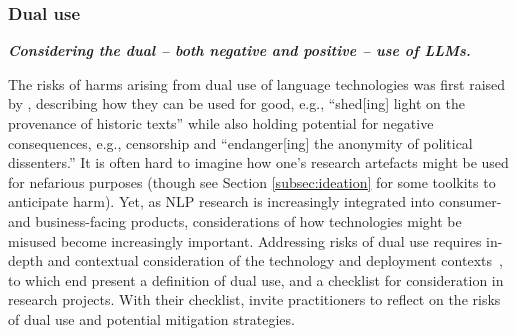 \subsubsection{Dual use}
\noindent\textbf{\textit{Considering the dual -- both negative and positive -- use of LLMs.}}
\newline 

\noindent The risks of harms arising from dual use of language technologies was first raised by \citet{hovy_social_2016}, describing how they can be used for good, e.g., ``shed[ing] light on the provenance of historic texts''%
while also holding potential for negative consequences, e.g., censorship and ``endanger[ing] the anonymity of political dissenters.''
It is often hard to imagine how one's research artefacts might be used for nefarious purposes (though see Section \cref{subsec:ideation} for some toolkits to anticipate harm).
Yet, as NLP research is increasingly integrated into consumer- and business-facing products, considerations of how technologies might be misused become increasingly important. Addressing risks of dual use requires in-depth and contextual consideration of the technology and deployment contexts~\citep{kaffee_thorny_2023}, to which end \citet{kaffee_thorny_2023} present a definition of dual use, and a checklist for consideration in research projects.
With their checklist, \citet{kaffee_thorny_2023} invite practitioners to reflect on the risks of dual use and potential mitigation strategies.

